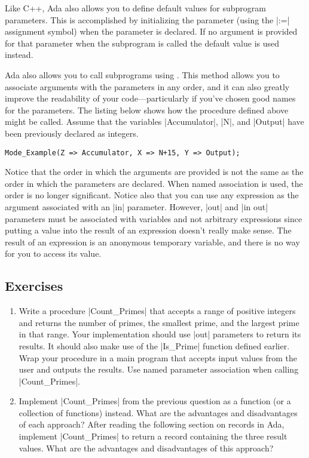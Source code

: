 Like C++, Ada also allows you to define default values for subprogram parameters. This is
accomplished by initializing the parameter (using the |:=| assignment symbol) when the parameter
is declared. If no argument is provided for that parameter when the subprogram is called the
default value is used instead.

Ada also allows you to call subprograms using . This
method allows you to associate arguments with the parameters in any order, and it can also
greatly improve the readability of your code---particularly if you've chosen good names for the
parameters. The listing below shows how the procedure defined above might be called. Assume that
the variables |Accumulator|, |N|, and |Output| have been previously declared as integers.

\begin{lstlisting}
Mode_Example(Z => Accumulator, X => N+15, Y => Output);
\end{lstlisting}

\noindent Notice that the order in which the arguments are provided is not the same as the order
in which the parameters are declared. When named association is used, the order is no longer
significant. Notice also that you can use any expression as the argument associated with an |in|
parameter. However, |out| and |in out| parameters must be associated with variables and not
arbitrary expressions since putting a value into the result of an expression doesn't really make
sense. The result of an expression is an anonymous temporary variable, and there is no way for
you to access its value.

\subsection*{Exercises}

\begin{enumerate}
\item Write a procedure |Count_Primes| that accepts a range of positive integers and returns the
  number of primes, the smallest prime, and the largest prime in that range. Your implementation
  should use |out| parameters to return its results. It should also make use of the |Is_Prime|
  function defined earlier. Wrap your procedure in a main program that accepts input values from
  the user and outputs the results. Use named parameter association when calling |Count_Primes|.

\item Implement |Count_Primes| from the previous question as a function (or a collection of
  functions) instead. What are the advantages and disadvantages of each approach? After reading
  the following section on records in Ada, implement |Count_Primes| to return a record
  containing the three result values. What are the advantages and disadvantages of this
  approach?
\end{enumerate}


